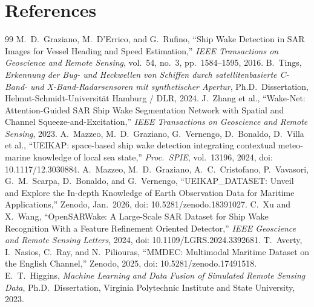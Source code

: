 \documentclass[11pt,a4paper]{article}
\begin{document}
\section{References}
{\begingroup
\renewcommand{\section}[2]{}
\begin{thebibliography}{99}
     M.\ D.\ Graziano, M.\ D'Errico, and G.\ Rufino, ``Ship Wake Detection in SAR Images for Vessel Heading and Speed Estimation,'' \textit{IEEE Transactions on Geoscience and Remote Sensing}, vol.\ 54, no.\ 3, pp.\ 1584--1595, 2016.
     B.\ Tings, \textit{Erkennung der Bug- und Heckwellen von Schiffen durch satellitenbasierte C-Band- und X-Band-Radarsensoren mit synthetischer Apertur}, Ph.D.\ Dissertation, Helmut-Schmidt-Universit\"at Hamburg / DLR, 2024.
     J.\ Zhang et al., ``Wake-Net: Attention-Guided SAR Ship Wake Segmentation Network with Spatial and Channel Squeeze-and-Excitation,'' \textit{IEEE Transactions on Geoscience and Remote Sensing}, 2023.
     A.\ Mazzeo, M.\ D.\ Graziano, G.\ Vernengo, D.\ Bonaldo, D.\ Villa et al., ``UEIKAP: space-based ship wake detection integrating contextual meteo-marine knowledge of local sea state,'' \textit{Proc.\ SPIE}, vol.\ 13196, 2024, doi: 10.1117/12.3030884.
     A.\ Mazzeo, M.\ D.\ Graziano, A.\ C.\ Cristofano, P.\ Vavasori, G.\ M.\ Scarpa, D.\ Bonaldo, and G.\ Vernengo, ``UEIKAP\_DATASET: Unveil and Explore the In-depth Knowledge of Earth Observation Data for Maritime Applications,'' Zenodo, Jan.\ 2026, doi: 10.5281/zenodo.18391027.
     C.\ Xu and X.\ Wang, ``OpenSARWake: A Large-Scale SAR Dataset for Ship Wake Recognition With a Feature Refinement Oriented Detector,'' \textit{IEEE Geoscience and Remote Sensing Letters}, 2024, doi: 10.1109/LGRS.2024.3392681.
     T.\ Averty, I.\ Nasios, C.\ Ray, and N.\ Piliouras, ``MMDEC: Multimodal Maritime Dataset on the English Channel,'' Zenodo, 2025, doi: 10.5281/zenodo.17491518.
     E.\ T.\ Higgins, \textit{Machine Learning and Data Fusion of Simulated Remote Sensing Data}, Ph.D.\ Dissertation, Virginia Polytechnic Institute and State University, 2023.

\end{thebibliography}}
\end{document}
